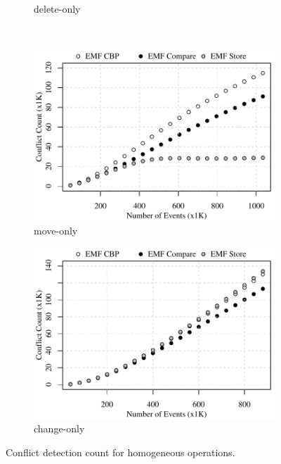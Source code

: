 \begin{figure}[ht]
\begin{subfigure}[t]{0.490\linewidth}
	\caption{delete-only}
	\label{fig:delete-conflict-count-events}
\end{subfigure}
\\
\begin{subfigure}[t]{0.490\linewidth}
	\includegraphics[width=\linewidth]{move-conflict-count-events}
	\caption{move-only}
	\label{fig:move-conflict-count-events}
\end{subfigure}
\hfill
\begin{subfigure}[t]{0.490\linewidth}
	\includegraphics[width=\linewidth]{change-conflict-count-events}
	\caption{change-only}
	\label{fig:change-conflict-count-events}
\end{subfigure}
\caption{Conflict detection count for homogeneous operations.}
\label{fig:homgeneous_operation_count_events}
\end{figure}


